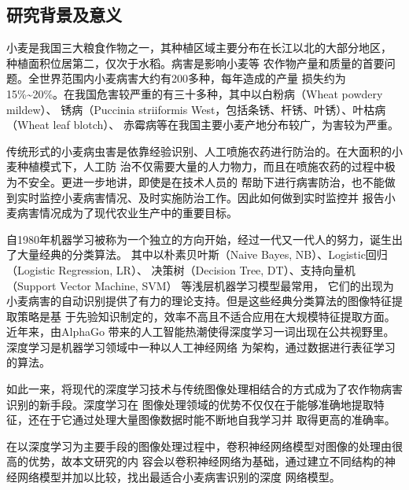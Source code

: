 
\subsection{\textbf{研究背景及意义}}
	小麦是我国三大粮食作物之一，其种植区域主要分布在长江以北的大部分地区，
	种植面积位居第二，仅次于水稻。病害是影响小麦等
	农作物产量和质量的首要问题。全世界范围内小麦病害大约有200多种，每年造成的产量
	损失约为15\%\textasciitilde20\%。在我国危害较严重的有三十多种，其中以白粉病（Wheat powdery mildew）、
	锈病（Puccinia striiformis West，包括条锈、杆锈、叶锈）、叶枯病（Wheat leaf blotch）、
	赤霉病等在我国主要小麦产地分布较广，为害较为严重\cite{CGRIS}。

	传统形式的小麦病虫害是依靠经验识别、人工喷施农药进行防治的。在大面积的小麦种植模式下，人工防
	治不仅需要大量的人力物力，而且在喷施农药的过程中极为不安全。更进一步地讲，即使是在技术人员的
	帮助下进行病害防治，也不能做到实时监控小麦病害情况、及时实施防治工作。因此如何做到实时监控并
	报告小麦病害情况成为了现代农业生产中的重要目标。

	自1980年机器学习被称为一个独立的方向开始，经过一代又一代人的努力，诞生出了大量经典的分类算法。
	其中以朴素贝叶斯（Naive Bayes, NB）、Logistic回归（Logistic Regression, LR）、
	决策树（Decision Tree, DT）、支持向量机（Support Vector Machine, SVM）
	等浅层机器学习模型最常用，
	它们的出现为小麦病害的自动识别提供了有力的理论支持。但是这些经典分类算法的图像特征提取策略是基
	于先验知识制定的，效率不高且不适合应用在大规模特征提取方面\cite{article1}。 近年来，由AlphaGo
	带来的人工智能热潮使得深度学习一词出现在公共视野里。 深度学习是机器学习领域中一种以人工神经网络
	为架构，通过数据进行表征学习的算法。

	如此一来，将现代的深度学习技术与传统图像处理相结合的方式成为了农作物病害识别的新手段。深度学习在
	图像处理领域的优势不仅仅在于能够准确地提取特征，还在于它通过处理大量图像数据时能不断地自我学习并
	取得更高的准确率。

	在以深度学习为主要手段的图像处理过程中，卷积神经网络模型对图像的处理由很高的优势，故本文研究的内
	容会以卷积神经网络为基础，通过建立不同结构的神经网络模型并加以比较，找出最适合小麦病害识别的深度
	网络模型。
